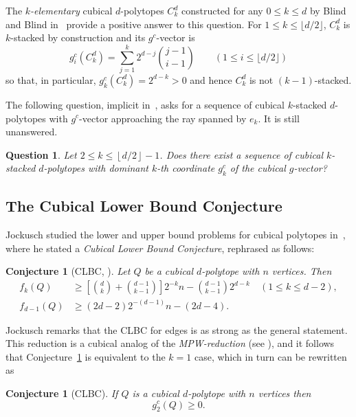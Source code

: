 \documentclass[a4paper,leqno]{article}
\newtheorem{conjecture}[theorem]{Conjecture}
\newtheorem{question}[theorem]{Question}
\theoremstyle{definition}
\newcommand{\gc}{g^c}
\newcommand{\dhalf}[1]{\left\lfloor #1/2\right\rfloor}
\begin{document}
The {\em $k$-elementary} cubical $d$-polytopes $C^d_k$ constructed for any $0\leq k\leq d$ by Blind and Blind in~\cite{BlinB95} provide a positive answer to this question. 
For $1 \le k \le \lfloor d/2 \rfloor$, $C^d_k$ is $k$-stacked by construction and its $\gc$-vector is
\[
g^c_i(C^d_k)
= \sum_{j=1}^{k} 2^{d-j} \binom{j-1}{i-1}
\qquad (1 \le i \le \lfloor d/2 \rfloor)
\]
so that, in particular, $g^c_k(C^d_k) = 2^{d-k} > 0$ and hence $C^d_k$ is not $(k-1)$-stacked.

The following question, implicit in~\cite{BabsBC97}, asks for a sequence of cubical $k$-stacked $d$-polytopes with $\gc$-vector approaching the ray spanned by $e_k$. It is still unanswered.
\begin{question}\label{Q:existBBC?}
Let $2\leq k\leq\dhalf{d}-1$.
Does there exist a sequence of cubical $k$-stacked $d$-polytopes with dominant $k$-th coordinate $g^c_k$ of the cubical $g$-vector?
\end{question}


\subsection{The Cubical Lower Bound Conjecture}
Jockusch studied the lower and upper bound problems for cubical polytopes in~\cite{Jock93}, where he stated a {\em Cubical Lower Bound Conjecture}, rephrased as follows:
\begin{conjecture}[CLBC, \cite{Jock93}]\label{conj:JCLBC}
	Let $Q$ be a cubical $d$-polytope with $n$ vertices. Then
	\begin{align*}
	f_k(Q) &\ge \left[ \binom{d}{k} + \binom{d-1}{k-1} \right] 2^{-k} n - \binom{d-1}{k-1} 2^{d-k} \quad (1 \le k \le d-2),\\
	f_{d-1}(Q) &\ge (2d-2) 2^{-(d-1)} n - (2d-4).
	\end{align*}
\end{conjecture}

Jockusch remarks that the CLBC for edges is as strong as the general statement. This reduction is a cubical analog of the {\em MPW-reduction} (see \cite[Theorem~1]{Barn73}), and it follows that Conjecture~\ref{conj:JCLBC} is equivalent to the $k=1$ case, which in turn can be rewritten as
\begin{conjecture}[CLBC]\label{conj:CLBC}
	If $Q$ is a cubical $d$-polytope with $n$ vertices then
	\begin{equation*}\gc_2(Q)\geq 0.\end{equation*}
\end{conjecture}




\end{document}
